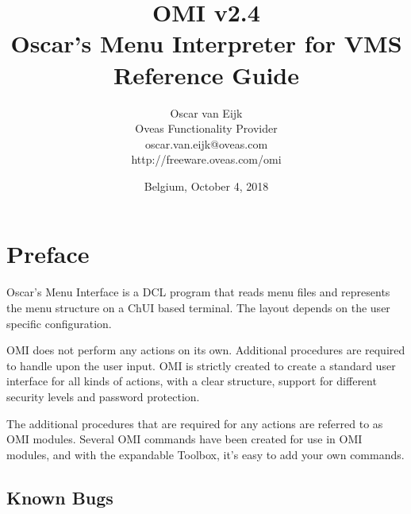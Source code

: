 \documentclass[a4paper]{book}
\newcommand{\vs}{\vspace{3mm}}
\begin{document}
\title{
OMI v2.4\\
Oscar's Menu Interpreter for VMS\\
Reference Guide}

\author{
Oscar van Eijk\\
Oveas Functionality Provider\\
oscar.van.eijk@oveas.com\\
http://freeware.oveas.com/omi}

\date{Belgium, October 4, 2018}

\maketitle

\tableofcontents
\listoffigures
\listoftables

\setcounter{page}{1}
\chapter*{Preface}
\label{sec:introductione}

Oscar's Menu Interface is a DCL program that reads menu files and 
represents the menu structure on a ChUI based terminal. The layout depends 
on the user specific configuration.

\vs

OMI does not perform any actions on its own. Additional procedures are 
required to handle upon the user input. OMI is strictly created to create a 
standard user interface for all kinds of actions, with a clear structure, 
support for different security levels and password protection.

\vs

The additional procedures that are required for any actions are referred to 
as OMI modules. Several OMI commands have been created for use in OMI 
modules, and with the expandable Toolbox, it's easy to add your own 
commands.

\section*{Known Bugs}
\label{subsec:known}
\end{document}
